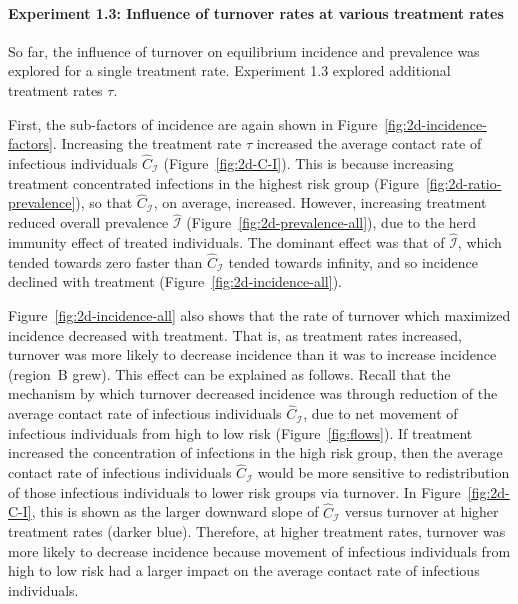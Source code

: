 \paragraph{Experiment 1.3: Influence of turnover rates at various treatment rates}
\label{p:res-turnover-2D}
So far, the influence of turnover on equilibrium incidence and prevalence
was explored for a single treatment rate.
Experiment 1.3 explored additional treatment rates $\tau$.
\par
First, the sub-factors of incidence are again shown
in Figure~\ref{fig:2d-incidence-factors}.
Increasing the treatment rate $\tau$ increased
the average contact rate of infectious individuals $\hat{C}_{\mathcal{I}}$
(Figure~\ref{fig:2d-C-I}).
This is because increasing treatment concentrated infections in the highest risk group
(Figure~\ref{fig:2d-ratio-prevalence}),
so that $\hat{C}_{\mathcal{I}}$, on average, increased.
However, increasing treatment reduced overall prevalence $\hat{\mathcal{I}}$
(Figure~\ref{fig:2d-prevalence-all}),
due to the herd immunity effect of treated individuals.
The dominant effect was that of $\hat{\mathcal{I}}$,
which tended towards zero faster than $\hat{C}_{\mathcal{I}}$ tended towards infinity,
and so incidence declined with treatment
(Figure~\ref{fig:2d-incidence-all}).
\par
Figure~\ref{fig:2d-incidence-all} also shows that
the rate of turnover which maximized incidence decreased with treatment.
That is, as treatment rates increased,
turnover was more likely to decrease incidence than it was to increase incidence
(region~B grew).
This effect can be explained as follows.
Recall that the mechanism by which turnover decreased incidence was through
reduction of the average contact rate of infectious individuals $\hat{C}_{\mathcal{I}}$,
due to net movement of infectious individuals from high to low risk
(Figure~\ref{fig:flows}).
If treatment increased the concentration of infections in the high risk group,
then the average contact rate of infectious individuals $\hat{C}_{\mathcal{I}}$
would be more sensitive to redistribution of those infectious individuals
to lower risk groups via turnover.
In Figure~\ref{fig:2d-C-I},
this is shown as the larger downward slope of $\hat{C}_{\mathcal{I}}$ versus turnover
at higher treatment rates (darker blue).
Therefore, at higher treatment rates,
turnover was more likely to decrease incidence
because movement of infectious individuals from high to low risk
had a larger impact on the average contact rate of infectious individuals.
